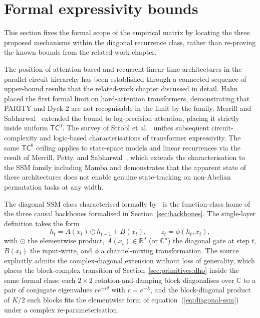 \section{Formal expressivity bounds}\label{sec:bounds}

This section fixes the formal scope of the empirical matrix by
locating the three proposed mechanisms within the diagonal
recurrence class, rather than re-proving the known bounds from
the related-work chapter.

The position of attention-based and recurrent linear-time
architectures in the parallel-circuit hierarchy has been established
through a connected sequence of upper-bound results that the
related-work chapter discussed in detail.
Hahn~\cite{hahn2020limitations} placed the first formal limit on
hard-attention transformers, demonstrating that PARITY and Dyck-2
are not recognisable in the limit by the family. Merrill and
Sabharwal~\cite{merrill2023parallelism} extended the bound to
log-precision attention, placing it strictly inside uniform
$\mathsf{TC}^{0}$. The survey of Strobl et
al.~\cite{strobl2024formal} unifies subsequent circuit-complexity
and logic-based characterisations of transformer expressivity. The
same $\mathsf{TC}^{0}$ ceiling applies to state-space models and
linear recurrences via the result of Merrill, Petty, and
Sabharwal~\cite{merrill2024illusion}, which extends the
characterisation to the SSM family including Mamba and demonstrates
that the apparent state of these architectures does not enable
genuine state-tracking on non-Abelian permutation tasks at any
width.

The diagonal SSM class characterised formally
by~\citet{sarrof2024expressive} is the function-class home of the
three causal backbones formalised in Section~\ref{sec:backbones}.
The single-layer definition takes the form
\begin{equation}\label{eq:diagonal-ssm}
h_{t} = A(x_{t}) \odot h_{t-1} + B(x_{t}), \qquad z_{t} = \phi(h_{t}, x_{t}),
\end{equation}
with $\odot$ the elementwise product, $A(x_{t}) \in \mathbb{R}^{d}$
(or $\mathbb{C}^{d}$) the diagonal gate at step $t$, $B(x_{t})$ the
input-write, and $\phi$ a channel-mixing transformation. The source
explicitly admits the complex-diagonal extension without loss of
generality, which places the block-complex transition of
Section~\ref{sec:primitives:dho} inside the same formal class: each
$2 \times 2$ rotation-and-damping block diagonalises over
$\mathbb{C}$ to a pair of conjugate eigenvalues $r e^{\pm i \theta}$
with $r = e^{-\lambda}$, and the block-diagonal product of $K/2$
such blocks fits the elementwise form of
equation~(\ref{eq:diagonal-ssm}) under a complex
re-parameterisation.


